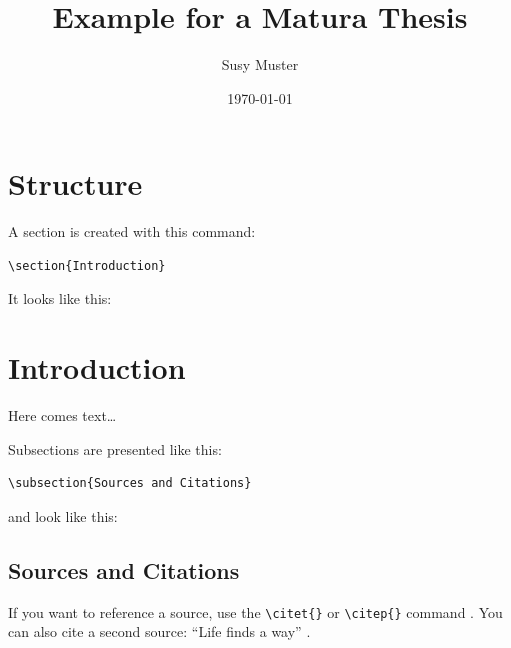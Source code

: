 \documentclass[12pt,a4paper]{article} %
\title{Example for a Matura Thesis}
\date{\today}
\author{Susy Muster}
\begin{document}
\maketitle %
% 

\newpage %
\tableofcontents %

\newpage

\section{Structure}

A section is created with this command:
\begin{verbatim}
\section{Introduction}
\end{verbatim}

It looks like this:

\section{Introduction}
Here comes text\ldots 

Subsections are presented like this:

\begin{verbatim}
\subsection{Sources and Citations}
\end{verbatim}

and look like this:

\subsection{Sources and Citations}


If you want to reference a source, use the \verb|\citet{}| or \verb|\citep{}| command \citep{example}. You can also cite a second source: “Life finds a way” \citep{buch2}.
\end{document}
